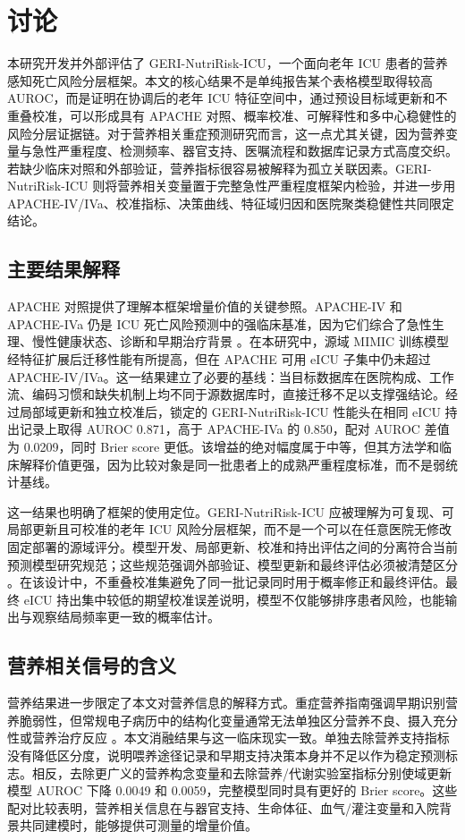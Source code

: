 \documentclass[11pt]{ctexart}
\begin{document}
\section{讨论}
本研究开发并外部评估了 GERI-NutriRisk-ICU，一个面向老年 ICU 患者的营养感知死亡风险分层框架。本文的核心结果不是单纯报告某个表格模型取得较高 AUROC，而是证明在协调后的老年 ICU 特征空间中，通过预设目标域更新和不重叠校准，可以形成具有 APACHE 对照、概率校准、可解释性和多中心稳健性的风险分层证据链。对于营养相关重症预测研究而言，这一点尤其关键，因为营养变量与急性严重程度、检测频率、器官支持、医嘱流程和数据库记录方式高度交织。若缺少临床对照和外部验证，营养指标很容易被解释为孤立关联因素。GERI-NutriRisk-ICU 则将营养相关变量置于完整急性严重程度框架内检验，并进一步用 APACHE-IV/IVa、校准指标、决策曲线、特征域归因和医院聚类稳健性共同限定结论。

\subsection{主要结果解释}
APACHE 对照提供了理解本框架增量价值的关键参照。APACHE-IV 和 APACHE-IVa 仍是 ICU 死亡风险预测中的强临床基准，因为它们综合了急性生理、慢性健康状态、诊断和早期治疗背景 \citep{Zimmerman2006ApacheIV}。在本研究中，源域 MIMIC 训练模型经特征扩展后迁移性能有所提高，但在 APACHE 可用 eICU 子集中仍未超过 APACHE-IV/IVa。这一结果建立了必要的基线：当目标数据库在医院构成、工作流、编码习惯和缺失机制上均不同于源数据库时，直接迁移不足以支撑强结论。经过局部域更新和独立校准后，锁定的 GERI-NutriRisk-ICU 性能头在相同 eICU 持出记录上取得 AUROC 0.871，高于 APACHE-IVa 的 0.850，配对 AUROC 差值为 0.0209，同时 Brier score 更低。该增益的绝对幅度属于中等，但其方法学和临床解释价值更强，因为比较对象是同一批患者上的成熟严重程度标准，而不是弱统计基线。

这一结果也明确了框架的使用定位。GERI-NutriRisk-ICU 应被理解为可复现、可局部更新且可校准的老年 ICU 风险分层框架，而不是一个可以在任意医院无修改固定部署的源域评分。模型开发、局部更新、校准和持出评估之间的分离符合当前预测模型研究规范；这些规范强调外部验证、模型更新和最终评估必须被清楚区分 \citep{Collins2024EvalPart1,Riley2024EvalPart2,Collins2024TRIPODAI}。在该设计中，不重叠校准集避免了同一批记录同时用于概率修正和最终评估。最终 eICU 持出集中较低的期望校准误差说明，模型不仅能够排序患者风险，也能输出与观察结局频率更一致的概率估计。

\subsection{营养相关信号的含义}
营养结果进一步限定了本文对营养信息的解释方式。重症营养指南强调早期识别营养脆弱性，但常规电子病历中的结构化变量通常无法单独区分营养不良、摄入充分性或营养治疗反应 \citep{Singer2023ESPENPractical,Compher2022ASPEN,Compher2025GLIMCriticalIllness}。本文消融结果与这一临床现实一致。单独去除营养支持指标没有降低区分度，说明喂养途径记录和早期支持决策本身并不足以作为稳定预测标志。相反，去除更广义的营养构念变量和去除营养/代谢实验室指标分别使域更新模型 AUROC 下降 0.0049 和 0.0059，完整模型同时具有更好的 Brier score。这些配对比较表明，营养相关信息在与器官支持、生命体征、血气/灌注变量和入院背景共同建模时，能够提供可测量的增量价值。
\end{document}

